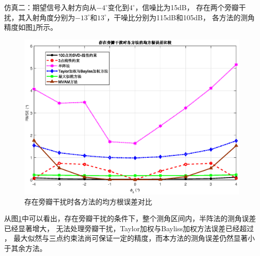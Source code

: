 \documentclass[master]{thesis-uestc}
\begin{document}
仿真二：期望信号入射方向从$-4^\circ$变化到$4^\circ$，信噪比为15dB，
存在两个旁瓣干扰，其入射角度分别为$-13^\circ$和$13^\circ$，干噪比分别为115dB和105dB，
各方法的测角精度如图\ref{SVD-JLC_RMSE_SLJ}所示。
\begin{figure}[H]
    \includegraphics[scale=0.5]{pic/SVD-JLC_RMSE_SLJ.eps}
    \caption{存在旁瓣干扰时各方法的均方根误差对比}
    \label{SVD-JLC_RMSE_SLJ}
\end{figure}
从图\ref{SVD-JLC_RMSE_SLJ}中可以看出，存在旁瓣干扰的条件下，整个测角区间内，半阵法的测角误差已经显著增大，
无法处理旁瓣干扰，Taylor加权与Bayliss加权方法误差已经超过 ，
最大似然与三点约束法尚可保证一定的精度，而本方法的测角误差仍然显著小于其余方法。
\end{document}

